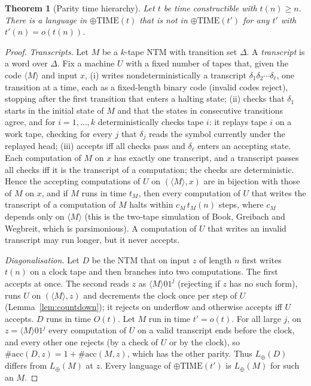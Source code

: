 \documentclass[11pt]{article}
\newtheorem{theorem}{Theorem}[section]
\theoremstyle{definition}
\theoremstyle{remark}
\newcommand{\parTIME}{\oplus\mathrm{TIME}}
\newcommand{\acc}{\#\mathrm{acc}}
\begin{document}
\begin{theorem}[Parity time hierarchy]\label{thm:hier}
Let $t$ be time constructible with $t(n)\ge n$. There is a language in $\parTIME(t)$ that is not in $\parTIME(t')$ for any $t'$
with $t'(n)=o(t(n))$.
\end{theorem}
\begin{proof}
\emph{Transcripts.} Let $M$ be a $k$-tape NTM with transition set $\Delta$. A \emph{transcript} is a word over $\Delta$. Fix a
machine $U$ with a fixed number of tapes that, given the code $\langle M\rangle$ and input $x$, (i) writes nondeterministically a
transcript $\delta_1\delta_2\cdots\delta_\ell$, one transition at a time, each as a fixed-length binary code (invalid codes
reject), stopping after the first transition that enters a halting state; (ii) checks that $\delta_1$ starts in the initial state
of $M$ and that the states in consecutive transitions agree, and for $i=1,\dots,k$ deterministically checks tape $i$: it replays
tape $i$ on a work tape, checking for every $j$ that $\delta_j$ reads the symbol currently under the replayed head; (iii) accepts
iff all checks pass and $\delta_\ell$ enters an accepting state. Each computation of $M$ on $x$ has exactly one transcript, and a
transcript passes all checks iff it is the transcript of a computation; the checks are deterministic. Hence the accepting
computations of $U$ on $(\langle M\rangle,x)$ are in bijection with those of $M$ on $x$, and if $M$ runs in time $t_M$, then every
computation of $U$ that writes the transcript of a computation of $M$ halts within $c_M\,t_M(n)$ steps, where $c_M$ depends only on
$\langle M\rangle$ (this is the two-tape simulation of Book, Greibach and Wegbreit, which is parsimonious). A computation of $U$
that writes an invalid transcript may run longer, but it never accepts.

\emph{Diagonalisation.} Let $D$ be the NTM that on input $z$ of length $n$ first writes $t(n)$ on a clock tape and then branches
into two computations. The first accepts at once. The second reads $z$ as $\langle M\rangle 0 1^j$ (rejecting if $z$ has no such
form), runs $U$ on $(\langle M\rangle,z)$ and decrements the clock once per step of $U$ (Lemma~\ref{lem:countdown}); it rejects on
underflow and otherwise accepts iff $U$ accepts. $D$ runs in time $O(t)$. Let $M$ run in time $t'=o(t)$. For all large $j$, on
$z=\langle M\rangle01^j$ every computation of $U$ on a valid transcript ends before the clock, and every other one rejects (by a
check of $U$ or by the clock), so $\acc(D,z)=1+\acc(M,z)$, which has the other parity.
Thus $L_\oplus(D)$ differs from $L_\oplus(M)$ at $z$. Every language of $\parTIME(t')$ is $L_\oplus(M)$ for such an $M$.
\end{proof}
\end{document}

